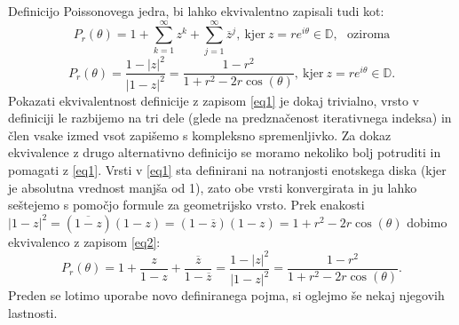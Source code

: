 \documentclass[mat1]{fmfdelo}
\begin{document}
    Definicijo Poissonovega jedra, bi lahko ekvivalentno zapisali tudi kot:
        \begin{equation}
            \label{eq1}
            P_r(\theta) = 1 + \sum_{k=1}^{\infty}{z^k} + \sum_{j=1}^{\infty}{\overline{z}^{j}},~\text{kjer}~z = r e^{i\theta} \in \mathbb{D},~~~\text{oziroma}
        \end{equation}
        \begin{equation}
            \label{eq2}
            P_r(\theta) = \frac{1 - |z|^2}{|1-z|^2} = \frac{1-r^2}{1+ r^2 - 2r \cos(\theta)},~\text{kjer}~z= re^{i\theta} \in \mathbb{D}.
        \end{equation}
    Pokazati ekvivalentnost definicije z zapisom \ref{eq1} je dokaj trivialno, vrsto v definiciji le razbijemo na tri dele (glede na predznačenost iterativnega indeksa) in člen vsake izmed vsot zapišemo s kompleksno spremenljivko. 
    Za dokaz ekvivalence z drugo alternativno definicijo se moramo nekoliko bolj potruditi in pomagati z \ref{eq1}. Vrsti v \ref{eq1} sta definirani na notranjosti enotskega diska (kjer je absolutna vrednost manjša od 1), zato obe vrsti konvergirata in ju lahko seštejemo s pomočjo formule za geometrijsko vrsto. 
    Prek enakosti $|1 - z|^2 = (\overline{1 - z})(1 - z) = (1 - \overline{z})(1 - z) = 1 + r^2 - 2r \cos(\theta)$ dobimo ekvivalenco z zapisom \ref{eq2}:
    $$
        P_r(\theta) = 1 + \frac{z}{1 - z} + \frac{\overline{z}}{1 - \overline{z}} = \frac{1 - |z|^2}{|1 - z|^2} = \frac{1 - r^2}{1 + r^2 - 2r\cos(\theta)}.
    $$
    Preden se lotimo uporabe novo definiranega pojma, si oglejmo še nekaj njegovih lastnosti. 
    
\end{document}

